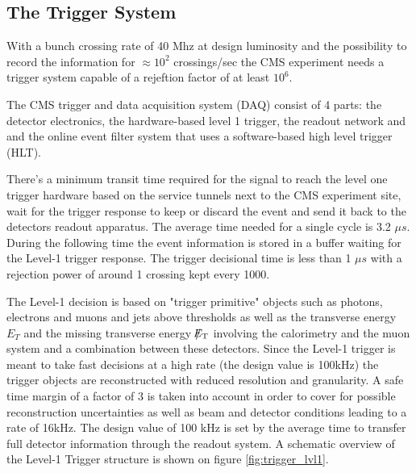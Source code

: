 \subsection{The Trigger System}

With a bunch crossing rate of 40 Mhz at design luminosity and the possibility to record the information for $\approx 10^{2}$ crossings/sec the CMS experiment needs a trigger system capable of a rejeftion factor of at least $10^{6}$.

The CMS trigger and data acquisition system (DAQ) consist of 4 parts: the detector electronics, the hardware-based level 1 trigger, the readout network and and the online event filter system that uses a software-based high level trigger (HLT).

There's a minimum transit time required for the signal to reach the level one trigger hardware based on the service tunnels next to the CMS experiment site, wait for the trigger response to keep or discard the event and send it back to the detectors readout apparatus. The average time needed for a single cycle is 3.2 $\mu s$. During the following time the event information is stored in a buffer waiting for the Level-1 trigger response. The trigger decisional time is less than 1 $\mu s$ with a rejection power of around 1 crossing kept every 1000.

The Level-1 decision is based on "trigger primitive" objects such as photons, electrons and muons and jets above thresholds as well as the transverse energy $E_{T}$ and the missing transverse energy $\slash\mkern-12mu{E}_{\text{T}}$ involving the calorimetry and the muon system and a combination between these detectors. Since the Level-1 trigger is meant to take fast decisions at a high rate (the design value is 100kHz) the trigger objects are reconstructed with reduced resolution and granularity. A safe time margin of a factor of 3 is taken into account in order to cover for possible reconstruction uncertainties as well as beam and detector conditions leading to a rate of 16kHz. The design value of 100 kHz is set by the average time to transfer full detector information through the readout system. A schematic overview of the Level-1 Trigger structure is shown on figure \ref{fig:trigger_lvl1}.

